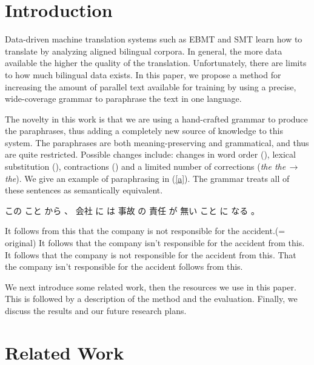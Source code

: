 \documentclass[english]{jnlp_1.4}
\newcommand{\para}[2]{}
\begin{document}
\maketitle



\section{Introduction}

Data-driven machine translation systems such as EBMT and SMT learn how
to translate by analyzing aligned bilingual corpora. In general, the
more data available the higher the quality of the translation.
Unfortunately, there are limits to how much bilingual data exists. In
this paper, we propose a method for increasing the amount of parallel
text available for training by using a precise, wide-coverage grammar
to paraphrase the text in one language.

The novelty in this work is that we are using a hand-crafted grammar
to produce the paraphrases, thus adding a completely new source of
knowledge to this system. The paraphrases are both meaning-preserving
and grammatical, and thus are quite restricted. Possible changes
include: changes in word order (\para{Kim sometimes goes}{Kim goes
sometimes}), lexical substitution (\para{everyone}{everybody}),
contractions (\para{going to}{gonna}) and a limited number of
corrections (\textit{the the}\,$\rightarrow$\,\textit{the}). We give
an example of paraphrasing in (\ref{a}). The grammar treats all of
these sentences as semantically equivalent.

\begin{exe}
\ex \label{a}
この こと から 、 会社 に は 事故 の 責任 が 無い こと に なる 。
\begin{xlist}
  \ex It follows from this that the company is not responsible for the
  accident.\hfill (= original)
  \ex It follows that the company isn't responsible for the accident
from this.
\ex  It follows that the company is not responsible for the accident
from this.
\ex That the company isn't responsible for the accident follows from this.
\end{xlist}
\end{exe}

We next introduce some related work, then the resources we use in this
paper. This is followed by a description of the method and the
evaluation. Finally, we discuss the results and our future research
plans.


\section{Related Work}
\end{document}
